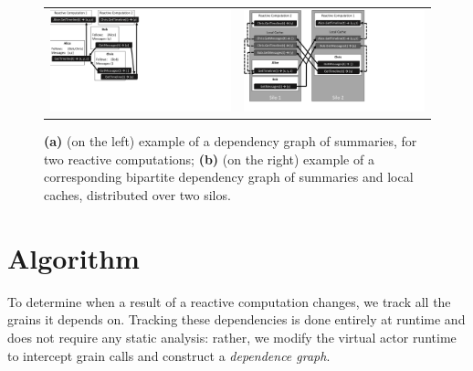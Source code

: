 
\begin{figure}
\centering
\begin{tabular}{cc}
\includegraphics[scale=.45, viewport=-1 164 480 540]{figs/summaries}
&
\includegraphics[scale=.4, viewport=-10 53 656 540]{figs/silos}\\
\end{tabular}
\caption{\textbf{(a)}  (on the left) example of a dependency graph of summaries, for two reactive computations; \textbf{(b)} (on the right) example of a corresponding bipartite dependency graph of summaries and local caches, distributed over two silos.}\label{fig:summaries}
\end{figure}

\section{Algorithm}

To determine when a result of a reactive computation changes, we track all the grains it depends on. Tracking these dependencies is done entirely at runtime and does not require any static analysis: rather, we modify the virtual actor runtime to intercept grain calls and construct a \emph{dependence graph}.

